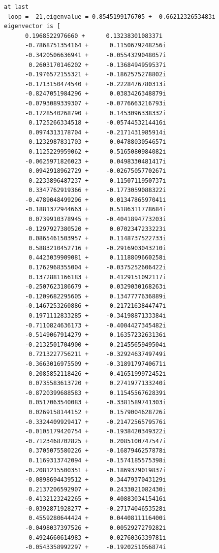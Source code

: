 \documentclass[12pt,a4paper,utf8]{ctexart}
\begin{document}
\begin{enumerate}
\begin{itemize}
\begin{lstlisting}
at last
 loop =  21,eigenvalue = 0.8545199176705 + -0.6621232653483i
eigenvector is [
      0.1968522976660 +      0.1323830108337i
      -0.7868751354164 +      0.1150679248256i
      -0.3420506636941 +     -0.0554329048057i
       0.2603170146202 +     -0.1368494959537i
      -0.1976572155321 +     -0.1862575278802i
      -0.1713150474540 +     -0.2228476780313i
      -0.8247051984296 +      0.0383426348879i
      -0.0793089339307 +     -0.0776663216793i
      -0.1728540268790 +      0.1453096338332i
       0.1725266334518 +     -0.0574453214416i
       0.0974313178704 +     -0.2171431985914i
       0.1232987831703 +      0.0478803054657i
       0.1125229959062 +      0.5165080984082i
      -0.0625971826023 +      0.0498330481417i
       0.0942918962729 +     -0.0267505770267i
       0.2233896487237 +      0.1150711950737i
       0.3347762919366 +     -0.1773059088322i
      -0.4789048499296 +      0.0134786597041i
      -0.1881372944663 +      0.5186311778684i
       0.0739910378945 +     -0.4041894773203i
      -0.1297927380520 +      0.0702347233223i
       0.0865461503957 +      0.1148737522733i
       0.5883210452716 +     -0.2916903043210i
       0.4423039909081 +      0.1118809660258i
       0.1762968355004 +     -0.0375252606422i
       0.1372881166183 +      0.4129151092117i
      -0.2507623186679 +      0.0329030168263i
      -0.1209682295605 +      0.1347777636889i
      -0.1467253260886 +      0.2172163844747i
       0.1971112833285 +     -0.3419887133384i
      -0.7110824636173 +     -0.4004427345482i
      -0.5149067914279 +      0.1635723263136i
      -0.2132501704900 +      0.2145565949504i
       0.7213227756211 +     -0.3292463749749i
      -0.3663016975509 +     -0.3189179740671i
       0.2085852118426 +      0.4165199972452i
       0.0735583613720 +      0.2741977133240i
      -0.8720399688583 +      0.1154556762839i
       0.0517063540083 +     -0.3381589741303i
       0.0269158144152 +      0.1579004628726i
      -0.3324409929417 +     -0.2147256579576i
      -0.0105179420754 +     -0.1938420349322i
      -0.7123468702825 +      0.2085100747547i
       0.3705075580226 +     -0.1687946257878i
       0.1169313742094 +     -0.1574185575398i
      -0.2081215500351 +     -0.1869379019837i
      -0.0898694439512 +      0.3447937043129i
       0.2137206592907 +      0.2433021082430i
      -0.4132123242265 +      0.4088303415416i
      -0.0392871928277 +     -0.2717404653528i
       0.4559280644424 +      0.0440811116400i
      -0.0498037397526 +      0.0052927279282i
       0.4924660614983 +      0.0276036339781i
      -0.0543358992297 +     -0.1920251056874i

\end{lstlisting}
\end{itemize}
\end{enumerate}
\end{document}
